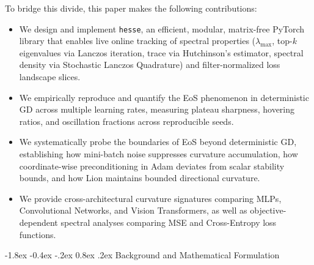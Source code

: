 \documentclass[10pt,twocolumn]{article}
\makeatletter
\renewcommand\section{\@startsection {section}{1}{\z@}%
                                   {-1.8ex \@plus -0.4ex \@minus -.2ex}%
                                   {0.8ex \@plus .2ex}%
                                   {\normalfont\large\bfseries}}
\makeatother
\begin{document}
To bridge this divide, this paper makes the following contributions:
\begin{itemize}
    \item We design and implement \texttt{hesse}, an efficient, modular, matrix-free PyTorch library that enables live online tracking of spectral properties ($\lambda_{\max}$, top-$k$ eigenvalues via Lanczos iteration, trace via Hutchinson's estimator, spectral density via Stochastic Lanczos Quadrature) and filter-normalized loss landscape slices.
    \item We empirically reproduce and quantify the EoS phenomenon in deterministic GD across multiple learning rates, measuring plateau sharpness, hovering ratios, and oscillation fractions across reproducible seeds.
    \item We systematically probe the boundaries of EoS beyond deterministic GD, establishing how mini-batch noise suppresses curvature accumulation, how coordinate-wise preconditioning in Adam deviates from scalar stability bounds, and how Lion maintains bounded directional curvature.
    \item We provide cross-architectural curvature signatures comparing MLPs, Convolutional Networks, and Vision Transformers, as well as objective-dependent spectral analyses comparing MSE and Cross-Entropy loss functions.
\end{itemize}

\section{Background and Mathematical Formulation}
\end{document}
